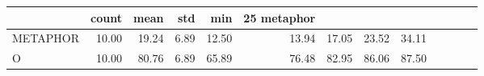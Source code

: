 \begin{tabular}{lrrrrrrrr}
\toprule
 & count & mean & std & min & 25%
metaphor &  &  &  &  &  &  &  &  \\
\midrule
METAPHOR & 10.00 & 19.24 & 6.89 & 12.50 & 13.94 & 17.05 & 23.52 & 34.11 \\
O & 10.00 & 80.76 & 6.89 & 65.89 & 76.48 & 82.95 & 86.06 & 87.50 \\
\bottomrule
\end{tabular}
